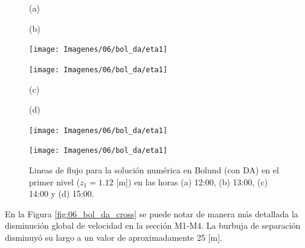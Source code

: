 \begin{figure}[H]
	\begin{minipage}{0.5\linewidth}
		\centering
		\hspace{1cm}(a)
	\end{minipage}%
	\begin{minipage}{0.5\linewidth}
		\centering
		\hspace{-1cm}(b)
	\end{minipage}%
	
	\begin{minipage}{0.5\linewidth}
		\centering
		\texttt{[image: Imagenes/06/bol\_da/eta1]}%
	\end{minipage}%
	\begin{minipage}{0.5\linewidth}
		\centering
		\texttt{[image: Imagenes/06/bol\_da/eta1]}%
	\end{minipage}%
	\vspace{1mm}
	
	\begin{minipage}{0.5\linewidth}
		\centering
		\hspace{1cm}(c)
	\end{minipage}%
	\begin{minipage}{0.5\linewidth}
		\centering
		\hspace{-1cm}(d)
	\end{minipage}%
	
	\begin{minipage}{0.5\linewidth}
		\centering
		\texttt{[image: Imagenes/06/bol\_da/eta1]}%
	\end{minipage}%
	\begin{minipage}{0.5\linewidth}
		\centering
		\texttt{[image: Imagenes/06/bol\_da/eta1]}%
	\end{minipage}%
	\caption{Lineas de flujo para la solución numérica en Bolund (con DA) en el primer nivel ($z_1 = 1.12$ [m]) en las horas (a) 12:00, (b) 13:00, (c) 14:00 y (d) 15:00.}
	\label{fig:06_bol_da_st}
\end{figure}
En la Figura \ref{fig:06_bol_da_cross} se puede notar de manera más detallada la disminución global de velocidad en la sección M1-M4. La burbuja de separación disminuyó su largo a un valor de aproximadamente 25 [m].
